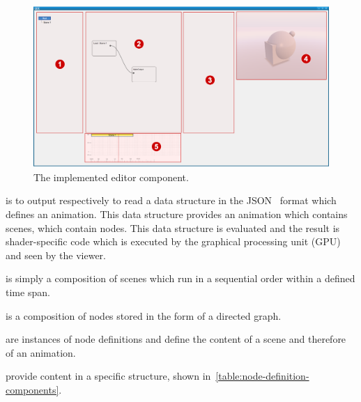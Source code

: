 \documentclass[%
    a4paper,    %
    justified,  %
    nobib,      %
    openany     %
]{tufte-book}
\makeatletter
\renewcommand{\label}[1]{\@tufte@label{##1}}%
\makeatother
\begin{document}
\begin{figure}[ht]
  \caption{The implemented editor component.}
  \label{fig:editor}
  \includegraphics[width=0.95\linewidth]{images/editor-components}
\end{figure}

 is to output respectively to
read a data structure in the JSON~\cite{ecma-json-2013} format which defines an
animation. This data structure provides an animation which contains scenes,
which contain nodes. This data structure is evaluated and the result is
shader-specific code which is executed by the graphical processing unit (GPU)
and seen by the viewer.

 is simply a composition of scenes which run in a
sequential order within a defined time span.

 is a composition of nodes stored in the form of a directed
graph.

 are instances of node definitions and define the content of a
scene and therefore of an animation.

 provide content in a specific structure, shown
in~\autoref{table:node-definition-components}.
\end{document}
